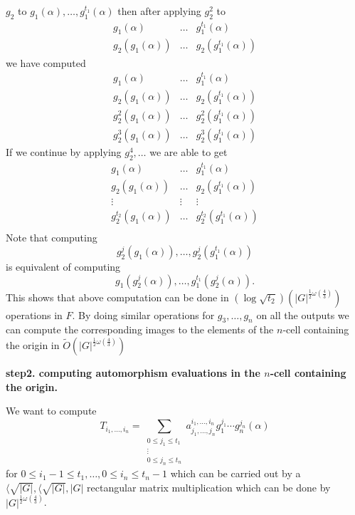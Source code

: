 \documentclass[sigconf]{acmart}
\theoremstyle{acmplain}
\begin{document}
 $g_2$ to $g_1(\alpha), \ldots , g_1^{t_1}(\alpha)$ then after applying $g_2^2$ to
\[
 \begin{array}{lll}
 g_1(\alpha)& \ldots & g_1^{t_1}(\alpha)\\
 g_2(g_1(\alpha))& \ldots & g_2(g_1^{t_1}(\alpha)) 
\end{array} 
\]
we have computed
\[
 \begin{array}{lll}
 g_1(\alpha)& \ldots & g_1^{t_1}(\alpha)\\
 g_2(g_1(\alpha))& \ldots & g_2(g_1^{t_1}(\alpha)) \\
 g_2^2(g_1(\alpha))& \ldots & g_2^2(g_1^{t_1}(\alpha)) \\
 g_2^3(g_1(\alpha))& \ldots & g_2^3(g_1^{t_1}(\alpha))
\end{array} 
\]
If we continue by applying $g_2^4, \ldots$ we are able to get
\[
 \begin{array}{lll}
 g_1(\alpha)& \ldots & g_1^{t_1}(\alpha)\\
 g_2(g_1(\alpha))& \ldots & g_2(g_1^{t_1}(\alpha)) \\
 \vdots & \vdots & \vdots\\
 g_2^{t_2}(g_1(\alpha))& \ldots & g_2^{t_2}(g_1^{t_1}(\alpha)) \\
\end{array} 
\]
Note that computing 
$$g_2^{j}(g_1(\alpha)), \ldots , g_2^{j}(g_1^{t_1}(\alpha))$$
is equivalent of computing 
$$g_1(g_2^{j}(\alpha)), \ldots , g_1^{t_1}(g_2^{j}(\alpha)).$$
This shows that above computation can be done in $(\log \sqrt{t_2})(\vert G \vert ^{\frac{1}{2}\omega(\frac{4}{3})})$ operations in $F$. By doing similar operations for $g_3, \ldots, g_n$ on all the outputs we can compute the corresponding images to the elements
of the $n$-cell containing the origin in $\tilde{O}(\vert G \vert ^{\frac{1}{2}\omega(\frac{4}{3})})$

\textbf{step2. computing automorphism evaluations in the $n$-cell containing the origin.}

We want to compute
$$T_{i_1, \ldots, i_n} = \sum_{\substack{0 \leq j_1 \leq t_1\\ \vdots \\ 0 \leq j_n \leq t_n}} a^{i_1, \ldots , i_n}_{j_1, \ldots , j_n}g_1^{j_1}\cdots g_n^{j_n}(\alpha)$$
for $0 \leq i_1-1 \leq t_1, \ldots , 0 \leq i_n \leq t_n-1$ which can be carried out by a $\langle \sqrt{\vert G \vert}, \langle \sqrt{\vert G \vert}, \vert G \vert$ rectangular matrix multiplication which can be done by 
$\vert G \vert ^{\frac{1}{2}\omega(\frac{4}{3})}$.
\end{document}
